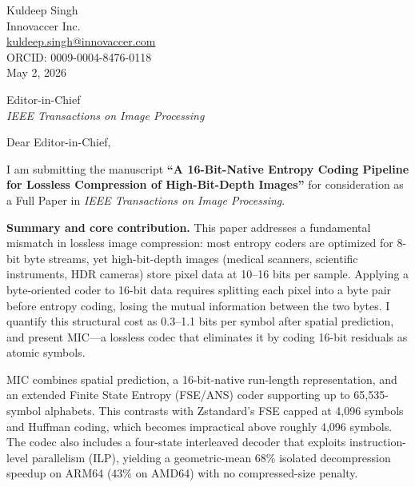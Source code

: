 \documentclass[12pt]{article}
\begin{document}
\begin{flushright}
Kuldeep Singh\\
Innovaccer Inc.\\
\href{mailto:kuldeep.singh@innovaccer.com}{kuldeep.singh@innovaccer.com}\\
ORCID: 0009-0004-8476-0118\\[6pt]
May 2, 2026
\end{flushright}

\bigskip

Editor-in-Chief\\
\textit{IEEE Transactions on Image Processing}

\bigskip

\noindent Dear Editor-in-Chief,

\medskip

I am submitting the manuscript \textbf{``A 16-Bit-Native Entropy Coding
Pipeline for Lossless Compression of High-Bit-Depth Images''} for consideration
as a Full Paper in \textit{IEEE Transactions on Image Processing}.

\medskip
\noindent\textbf{Summary and core contribution.}
This paper addresses a fundamental mismatch in lossless image compression:
most entropy coders are optimized for 8-bit byte streams, yet high-bit-depth
images (medical scanners, scientific instruments, HDR cameras) store pixel
data at 10--16 bits per sample. Applying a byte-oriented coder to 16-bit data
requires splitting each pixel into a byte pair before entropy coding, losing
the mutual information between the two bytes. I quantify this structural cost
as 0.3--1.1 bits per symbol after spatial prediction, and present MIC---a
lossless codec that eliminates it by coding 16-bit residuals as atomic symbols.

MIC combines spatial prediction, a 16-bit-native run-length representation,
and an extended Finite State Entropy (FSE/ANS) coder supporting up to
65,535-symbol alphabets. This contrasts with Zstandard's FSE capped at 4,096
symbols and Huffman coding, which becomes impractical above roughly 4,096
symbols. The codec also includes a four-state interleaved decoder that exploits
instruction-level parallelism (ILP), yielding a geometric-mean 68\% isolated
decompression speedup on ARM64 (43\% on AMD64) with no compressed-size
penalty.
\end{document}
